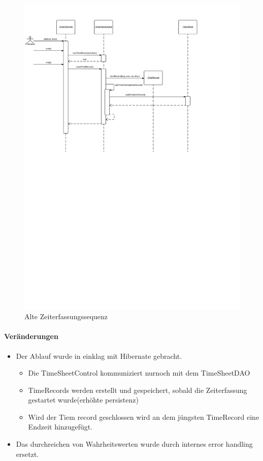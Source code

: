 \begin{figure}
  \centering
    \includegraphics[width=\linewidth]{new-Time-record.pdf}
   \caption{Alte Zeiterfassungssequenz}
\end{figure}

\paragraph{Veränderungen}
\begin{itemize}
    \item Der Ablauf wurde in einklag mit Hibernate gebracht.
    \begin{itemize}
        \item Die TimeSheetControl kommuniziert nurnoch mit dem TimeSheetDAO
        \item TimeRecords werden erstellt und gespeichert, sobald die Zeiterfassung gestartet wurde(erhöhte persistenz)
        \item Wird der Tiem record geschlossen wird an dem jüngsten TimeRecord eine Endzeit hinzugefügt.
    \end{itemize}
    \item Das durchreichen von Wahrheitswerten wurde durch internes error handling ersetzt.
\end{itemize}

